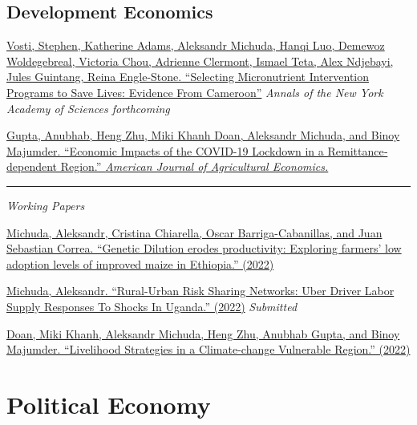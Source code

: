 \documentclass[
  11pt]{article}
\begin{document}
\hypertarget{development-economics}{%
\subsection{Development Economics}\label{development-economics}}

\href{https://academic.oup.com/cdn/article/5/Supplement_2/693/6292849}{Vosti,
Stephen, Katherine Adams, Aleksandr Michuda, Hanqi Luo, Demewoz
Woldegebreal, Victoria Chou, Adrienne Clermont, Ismael Teta, Alex
Ndjebayi, Jules Guintang, Reina Engle-Stone. ``Selecting Micronutrient
Intervention Programs to Save Lives: Evidence From Cameroon''}
\emph{Annals of the New York Academy of Sciences forthcoming}

\href{https://onlinelibrary.wiley.com/doi/full/10.1111/ajae.12178}{Gupta,
Anubhab, Heng Zhu, Miki Khanh Doan, Aleksandr Michuda, and Binoy
Majumder. ``Economic Impacts of the COVID-19 Lockdown in a
Remittance‐dependent Region.'' \emph{American Journal of Agricultural
Economics.}}

\begin{center}\rule{0.5\linewidth}{0.5pt}\end{center}

\emph{Working Papers}

\href{https://drive.google.com/file/d/1sqC0W1mUMzPzQreimT22qnqsnNlIj3bc/view?usp=sharing}{Michuda,
Aleksandr, Cristina Chiarella, Oscar Barriga-Cabanillas, and Juan
Sebastian Correa. ``Genetic Dilution erodes productivity: Exploring
farmers' low adoption levels of improved maize in Ethiopia.'' (2022)}

\href{https://drive.google.com/file/d/14VANz8V45C6bIX1d4__IMmOn5xNJM5a7/view?usp=sharing}{Michuda,
Aleksandr. ``Rural-Urban Risk Sharing Networks: Uber Driver Labor Supply
Responses To Shocks In Uganda.'' (2022)} \emph{Submitted}

\href{https://scholar.google.com/scholar_url?url=https://ageconsearch.umn.edu/record/322365/files/24195.pdf\&hl=en\&sa=T\&oi=gsb-gga\&ct=res\&cd=2\&d=12962046704729585600\&ei=7e1vY4C5MIqUy9YP-OmKyAQ\&scisig=AAGBfm2aaJtfS_KnDh5hRc47a4cZxX41aw}{Doan,
Miki Khanh, Aleksandr Michuda, Heng Zhu, Anubhab Gupta, and Binoy
Majumder. ``Livelihood Strategies in a Climate-change Vulnerable
Region.'' (2022)}

\hypertarget{political-economy}{%
\section{Political Economy}\label{political-economy}}
\end{document}
